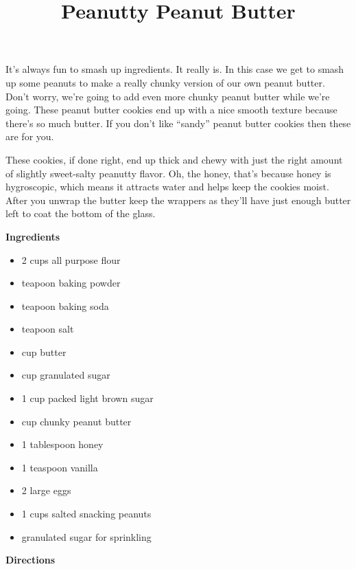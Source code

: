 \documentclass{article}
\title{Peanutty Peanut Butter}
\begin{document}
It's always fun to smash up ingredients. It really is. In this case we get to smash up some peanuts to
make a really chunky version of our own peanut butter. Don't worry, we're going to add even more
chunky peanut butter while we're going. These peanut butter cookies end up with a nice smooth texture
because there's so much butter. If you don't like ``sandy'' peanut butter cookies then these are for you.

These cookies, if done right, end up thick and chewy with just the right amount of slightly sweet-salty
peanutty flavor. Oh, the honey, that's because honey is hygroscopic, which means it attracts water
and helps keep the cookies moist. After you unwrap the butter keep the wrappers as they'll have just
enough butter left to coat the bottom of the glass.

\textbf{Ingredients}

\begin{multicols}{2}

      \begin{itemize}
            \item 2 cups all purpose flour
            \item {} teapoon baking powder
            \item {} teapoon baking soda
            \item {} teapoon salt

            \item {} cup butter
            \item {} cup granulated sugar
            \item 1 cup packed light brown sugar
            \item {} cup chunky peanut butter
            \item 1 tablespoon honey
            \item 1 teaspoon vanilla
            \item 2 large eggs

            \item 1 cups salted snacking peanuts
            \item granulated sugar for sprinkling
      \end{itemize}
\end{multicols}

\textbf{Directions}
\end{document}
